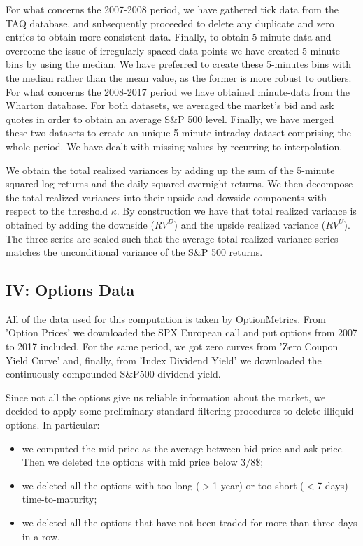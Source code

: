 \vspace{4mm}
For what concerns the 2007-2008 period, we have gathered tick data from the TAQ database, and subsequently proceeded to delete any duplicate and zero entries to obtain more consistent data. Finally, to obtain 5-minute data and overcome the issue of irregularly spaced data points we have created 5-minute bins by using the median. We have preferred to create these 5-minutes bins with the median rather than the mean value, as the former is more robust to outliers.  
For what concerns the 2008-2017 period we have obtained minute-data from the Wharton database. For both datasets, we averaged the market's bid and ask quotes in order to obtain an average S\&P 500 level. Finally, we have merged these two datasets to create an unique 5-minute intraday dataset comprising the whole period. We have dealt with missing values by recurring to interpolation.

\vspace{4mm}
We obtain the total realized variances by adding up the sum of the 5-minute squared log-returns and the daily squared overnight returns. We then decompose the total realized variances into their upside and dowside components with respect to the threshold $\kappa$. By construction we have that total realized variance is obtained by adding the downside ($RV^D$) and the upside realized variance ($RV^U$). 
The three series are scaled such that the average total realized variance series matches the unconditional variance of the S\&P 500 returns.


\subsection{IV: Options Data}
All of the data used for this computation is taken by OptionMetrics. From 'Option Prices' we downloaded the SPX European call and put options from 2007 to 2017 included. For the same period, we got zero curves from 'Zero Coupon Yield Curve' and, finally, from 'Index Dividend Yield' we downloaded the continuously compounded S\&P500 dividend yield.

\vspace{4mm}
Since not all the options give us reliable information about the market, we decided to apply some preliminary standard filtering procedures to delete illiquid options. In particular:
\begin{itemize}
    \item we computed the mid price as the average between bid price and ask price. Then we deleted the options with mid price below $3/8\$$;
    \item we deleted all the options with too long ($>$1 year) or too short ($<$7 days) time-to-maturity;
    \item we deleted all the options that have not been traded for more than three days in a row.
\end{itemize}

